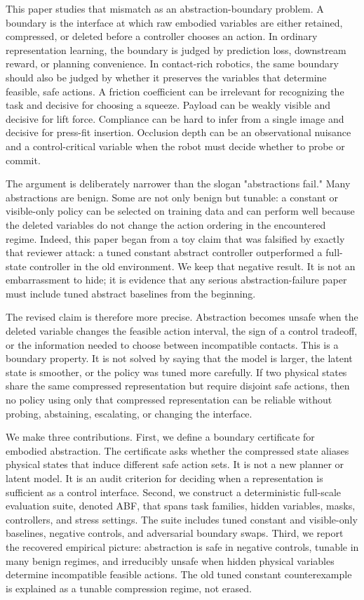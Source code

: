 \documentclass{article}
\newcommand{\suite}{ABF}
\begin{document}
This paper studies that mismatch as an abstraction-boundary problem. A boundary is
the interface at which raw embodied variables are either retained, compressed, or
deleted before a controller chooses an action. In ordinary representation
learning, the boundary is judged by prediction loss, downstream reward, or
planning convenience. In contact-rich robotics, the same boundary should also be
judged by whether it preserves the variables that determine feasible, safe
actions. A friction coefficient can be irrelevant for recognizing the task and
decisive for choosing a squeeze. Payload can be weakly visible and decisive for
lift force. Compliance can be hard to infer from a single image and decisive for
press-fit insertion. Occlusion depth can be an observational nuisance and a
control-critical variable when the robot must decide whether to probe or commit.

The argument is deliberately narrower than the slogan "abstractions fail." Many
abstractions are benign. Some are not only benign but tunable: a constant or
visible-only policy can be selected on training data and can perform well because
the deleted variables do not change the action ordering in the encountered
regime. Indeed, this paper began from a toy claim that was falsified by exactly
that reviewer attack: a tuned constant abstract controller outperformed a
full-state controller in the old environment. We keep that negative result. It is
not an embarrassment to hide; it is evidence that any serious abstraction-failure
paper must include tuned abstract baselines from the beginning.

The revised claim is therefore more precise. Abstraction becomes unsafe when the
deleted variable changes the feasible action interval, the sign of a control
tradeoff, or the information needed to choose between incompatible contacts. This
is a boundary property. It is not solved by saying that the model is larger, the
latent state is smoother, or the policy was tuned more carefully. If two physical
states share the same compressed representation but require disjoint safe actions,
then no policy using only that compressed representation can be reliable without
probing, abstaining, escalating, or changing the interface.

We make three contributions. First, we define a boundary certificate for embodied
abstraction. The certificate asks whether the compressed state aliases physical
states that induce different safe action sets. It is not a new planner or latent
model. It is an audit criterion for deciding when a representation is sufficient
as a control interface. Second, we construct a deterministic full-scale evaluation
suite, denoted \suite, that spans task families, hidden variables, masks,
controllers, and stress settings. The suite includes tuned constant and
visible-only baselines, negative controls, and adversarial boundary swaps. Third,
we report the recovered empirical picture: abstraction is safe in negative
controls, tunable in many benign regimes, and irreducibly unsafe when hidden
physical variables determine incompatible feasible actions. The old tuned
constant counterexample is explained as a tunable compression regime, not erased.
\end{document}
